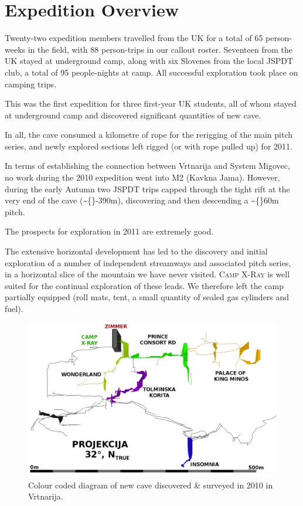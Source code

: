 \hypertarget{expedition-overview}{%
\section{Expedition Overview}\label{expedition-overview}}

Twenty-two expedition members travelled from the UK for a total of 65
person-weeks in the field, with 88 person-trips in our callout roster.
Seventeen from the UK stayed at underground camp, along with six
Slovenes from the local JSPDT club, a total of 95 people-nights at camp.
All successful exploration took place on camping trips.

This was the first expedition for three first-year UK students, all of
whom stayed at underground camp and discovered significant quantities of
new cave.

In all, the cave consumed a kilometre of rope for the rerigging of the
main pitch series, and newly explored sections left rigged (or with rope
pulled up) for 2011.

In terms of establishing the connection between Vrtnarija and System
Migovec, no work during the 2010 expedition went into M2 (Kavkna Jama).
However, during the early Autumn two JSPDT trips capped through the
tight rift at the very end of the cave (\textasciitilde\{\}-390m),
discovering and then descending a \textasciitilde\{\}60m pitch.

The prospects for exploration in 2011 are extremely good.

The extensive horizontal development has led to the discovery and
initial exploration of a number of independent streamways and associated
pitch series, in a horizontal slice of the mountain we have never
visited. \textsc{Camp X-Ray} is well suited for the continual
exploration of these leads. We therefore left the camp partially
equipped (roll mats, tent, a small quantity of sealed gas cylinders and
fuel).

\begin{figure}
\includegraphics[width=0.85\columnwidth]{2010/2010_deep_vrtnarija_colour_coded_inverted_labelled}
\caption{Colour coded diagram of new cave discovered \& surveyed in 2010 in
Vrtnarija.}
\end{figure}

